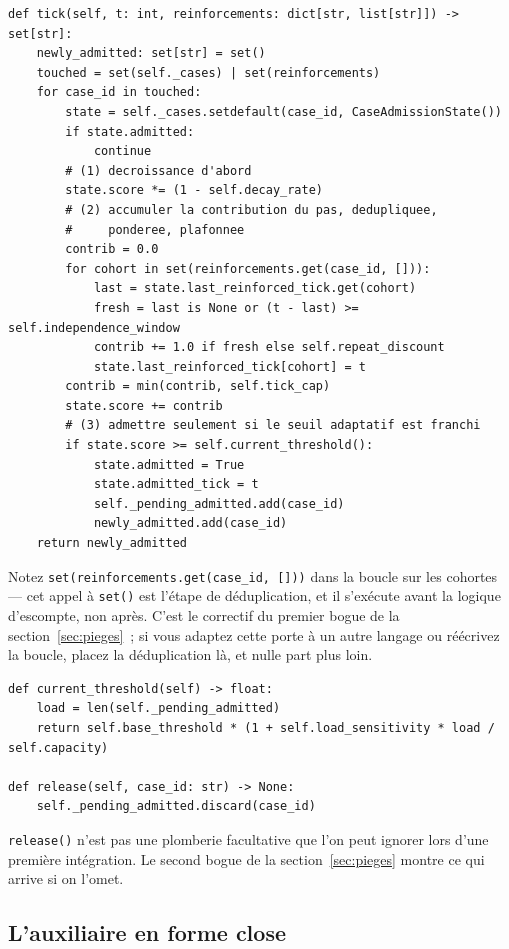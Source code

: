 \documentclass[11pt]{article}
\begin{document}
\begin{lstlisting}
def tick(self, t: int, reinforcements: dict[str, list[str]]) -> set[str]:
    newly_admitted: set[str] = set()
    touched = set(self._cases) | set(reinforcements)
    for case_id in touched:
        state = self._cases.setdefault(case_id, CaseAdmissionState())
        if state.admitted:
            continue
        # (1) decroissance d'abord
        state.score *= (1 - self.decay_rate)
        # (2) accumuler la contribution du pas, dedupliquee,
        #     ponderee, plafonnee
        contrib = 0.0
        for cohort in set(reinforcements.get(case_id, [])):
            last = state.last_reinforced_tick.get(cohort)
            fresh = last is None or (t - last) >= self.independence_window
            contrib += 1.0 if fresh else self.repeat_discount
            state.last_reinforced_tick[cohort] = t
        contrib = min(contrib, self.tick_cap)
        state.score += contrib
        # (3) admettre seulement si le seuil adaptatif est franchi
        if state.score >= self.current_threshold():
            state.admitted = True
            state.admitted_tick = t
            self._pending_admitted.add(case_id)
            newly_admitted.add(case_id)
    return newly_admitted
\end{lstlisting}

Notez \texttt{set(reinforcements.get(case\_id, []))} dans la boucle sur
les cohortes --- cet appel à \texttt{set()} est l'étape de déduplication,
et il s'exécute avant la logique d'escompte, non après. C'est le correctif
du premier bogue de la section~\ref{sec:pieges}~; si vous adaptez cette
porte à un autre langage ou réécrivez la boucle, placez la déduplication
là, et nulle part plus loin.

\begin{lstlisting}
def current_threshold(self) -> float:
    load = len(self._pending_admitted)
    return self.base_threshold * (1 + self.load_sensitivity * load / self.capacity)

def release(self, case_id: str) -> None:
    self._pending_admitted.discard(case_id)
\end{lstlisting}

\texttt{release()} n'est pas une plomberie facultative que l'on peut
ignorer lors d'une première intégration. Le second bogue de la
section~\ref{sec:pieges} montre ce qui arrive si on l'omet.

\subsection{L'auxiliaire en forme close}
\end{document}
